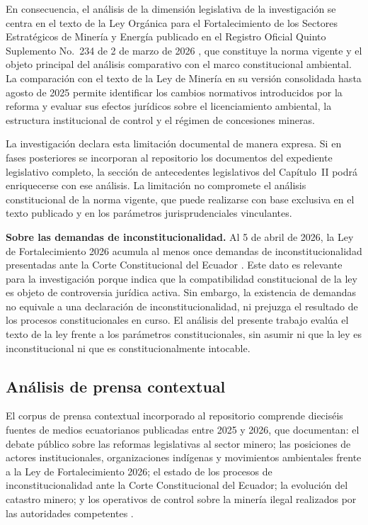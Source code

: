 En consecuencia, el análisis de la dimensión legislativa de la investigación se centra en el texto de la Ley Orgánica para el Fortalecimiento de los Sectores Estratégicos de Minería y Energía publicado en el Registro Oficial Quinto Suplemento No.\ 234 de 2 de marzo de 2026 \parencite{ley_fortalecimiento_2026}, que constituye la norma vigente y el objeto principal del análisis comparativo con el marco constitucional ambiental. La comparación con el texto de la Ley de Minería en su versión consolidada hasta agosto de 2025 \parencite{ley_mineria_2025} permite identificar los cambios normativos introducidos por la reforma y evaluar sus efectos jurídicos sobre el licenciamiento ambiental, la estructura institucional de control y el régimen de concesiones mineras.

La investigación declara esta limitación documental de manera expresa. Si en fases posteriores se incorporan al repositorio los documentos del expediente legislativo completo, la sección de antecedentes legislativos del Capítulo~II podrá enriquecerse con ese análisis. La limitación no compromete el análisis constitucional de la norma vigente, que puede realizarse con base exclusiva en el texto publicado y en los parámetros jurisprudenciales vinculantes.

\textbf{Sobre las demandas de inconstitucionalidad.} Al 5 de abril de 2026, la Ley de Fortalecimiento 2026 acumula al menos once demandas de inconstitucionalidad presentadas ante la Corte Constitucional del Ecuador \parencite{primicias_demandas_2026}. Este dato es relevante para la investigación porque indica que la compatibilidad constitucional de la ley es objeto de controversia jurídica activa. Sin embargo, la existencia de demandas no equivale a una declaración de inconstitucionalidad, ni prejuzga el resultado de los procesos constitucionales en curso. El análisis del presente trabajo evalúa el texto de la ley frente a los parámetros constitucionales, sin asumir ni que la ley es inconstitucional ni que es constitucionalmente intocable.

\subsection{Análisis de prensa contextual}

El corpus de prensa contextual incorporado al repositorio comprende dieciséis fuentes de medios ecuatorianos publicadas entre 2025 y 2026, que documentan: el debate público sobre las reformas legislativas al sector minero; las posiciones de actores institucionales, organizaciones indígenas y movimientos ambientales frente a la Ley de Fortalecimiento 2026; el estado de los procesos de inconstitucionalidad ante la Corte Constitucional del Ecuador; la evolución del catastro minero; y los operativos de control sobre la minería ilegal realizados por las autoridades competentes \parencite{primicias_demandas_2026,arcom_rendicion_cuentas_2024}.

